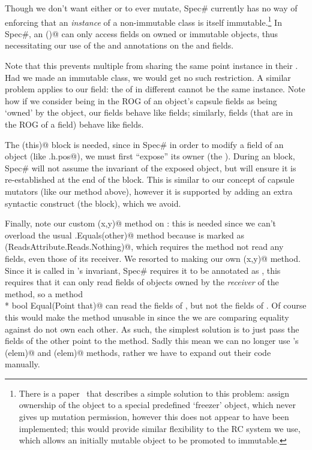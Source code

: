 Though we don't want either \Q@pos@ or \Q@path@ to ever mutate, Spec\# currently has no way of enforcing that an \emph{instance} of a non-immutable class is itself immutable.\footnote{There is a paper~\cite{DBLP:conf/vstte/LeinoMW08} that describes a simple solution to this problem: assign ownership of the object to a special predefined `freezer' object, which never gives up mutation permission, however this does not appear to have been implemented; this would provide similar flexibility to the RC system we use, which allows an initially mutable object to be promoted to immutable.} In Spec\#, an \Q@invariant()@ can only access fields on owned or immutable objects, thus necessitating our use of the \Q@Peer@ and \Q@Rep@ annotations on the \Q@pos@ and \Q@path@ fields.

Note that this prevents multiple \Q@Cage@s from sharing the same point instance in their \@path@.
Had we made \Q@Point@ an immutable class, we would get no such restriction. A similar problem applies to our \Q@pos@ field: the \Q@pos@ of \Q@Hamster@s in different  \Q@Cage@s cannot be the same \Q@Point@ instance.
Note how if we consider being in the ROG of an object's capsule fields as being `owned' by the object, our \Q@capsule@ fields behave like \Q@Rep@ fields; similarly, \Q@mut@ fields (that are in the ROG of a \Q@capsule@ field) behave like \Q@Peer@ fields.

The \Q@expose(this)@ block is needed, since in Spec\# in order to modify a field of an object (like \Q@this.h.pos@), we must first ``expose'' its owner (the \Q@Cage@). During an \Q@expose@ block, Spec\# will not assume the invariant of the exposed object, but will ensure it is re-established at the end of the block. This is similar to our concept of capsule mutators (like our \Q@moveTo@ method above), however it is supported by adding an extra syntactic construct (the \Q@expose@ block), which we avoid.

Finally, note our custom \Q@Equal(x,y)@ method on \Q@Point@: this is needed since we can't overload the usual \Q@Object.Equals(other)@ method because is marked as \Q@Reads(ReadsAttribute.Reads.Nothing)@, which requires the method not read any fields, even those of its receiver.
We resorted to making our own \Q@Equal(x,y)@ method. Since it is called in \Q@Cage@'s invariant, Spec\# requires it to be annotated as \Q@Pure@, this requires that it can only read fields of objects owned by the \emph{receiver} of the method, so a method\\* \Q@[Pure] bool Equal(Point that)@ can read the fields of \Q@this@, but not the fields of \Q@that@. Of course this would make the method unusable in \Q@Cage@ since the \Q@Point@s we are comparing equality against do not own each other. As such, the simplest solution is to just pass the fields of the other point to the method.
Sadly this mean we can no longer use \Q@List@'s \Q@Contains(elem)@ and \Q@IndexOf(elem)@ methods, rather we have to expand out their code manually.

